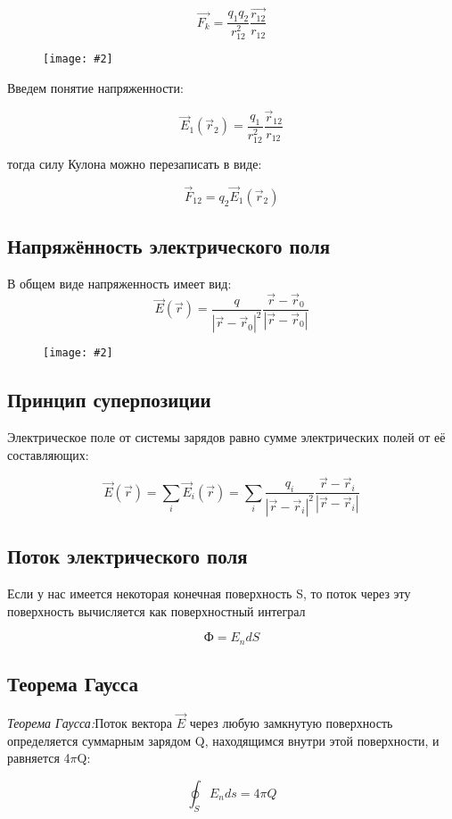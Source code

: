 \documentclass[a4paper,12pt]{article}
\newcommand{\kr}[1]{\textit{#1}}
\newcommand{\fc}[1]{\[#1\]}
\newcommand{\imc}[2][0.7\textwidth]{%
    \begin{figure}[h!]
        \centering
        \texttt{[image: \#2]}
    \end{figure}%
}
\begin{document}
\[\vec{F_k}=\frac{q_1q_2}{r_{12}^2}\frac{\vec{r_{12}}}{r_{12}}\]

\imc[0.5\textwidth]{2.png} 

Введем понятие напряженности:

\[\vec{E}_1(\vec{r}_2) = \frac{q_1}{r_{12}^2} \frac{\vec{r}_{12}}{r_{12}}\]

тогда силу Кулона можно перезаписать в виде:

\[\vec{F}_{12} = q_2 \vec{E}_1(\vec{r}_2)\]

\newpage


\subsection*{Напряжённость электрического поля}

В общем виде напряженность имеет вид:
\[\vec{E}(\vec{r}) = \frac{q}{|\vec{r} - \vec{r}_0|^2} \frac{\vec{r} -
\vec{r}_0}{|\vec{r} - \vec{r}_0|}\]

\imc[0.5\textwidth]{1.png} 

\subsection*{Принцип суперпозиции}

Электрическое поле от системы зарядов равно сумме электрических полей от её
составляющих:

\fc{\vec{E}(\vec{r}) = \sum_i \vec{E}_i(\vec{r}) = \sum_i \frac{q_i}{|\vec{r} -
\vec{r}_i|^2}\frac{ \vec{r} - \vec{r}_i}{|\vec{r} - \vec{r}_i|}}

\subsection*{Поток электрического поля}

Если у нас имеется некоторая конечная поверхность S, то поток
через эту поверхность вычисляется как поверхностный интеграл

\fc{\text{Ф}= E_ndS}

\subsection*{Теорема Гаусса}

\kr{Теорема Гаусса:}Поток вектора $\vec{E}$ через любую замкнутую
поверхность определяется суммарным зарядом Q, находящимся внутри этой
поверхности, и равняется 4$\pi$Q:

\fc{\oint_SE_nds=4\pi Q}
\end{document}
